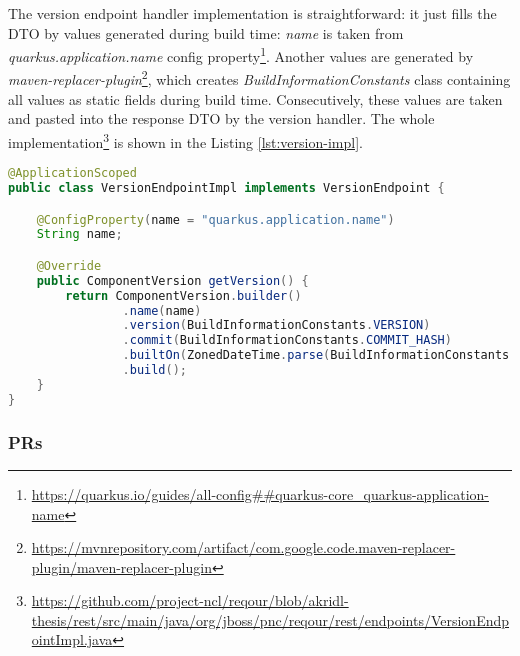 \documentclass[../main.tex]{subfiles}
\begin{document}
The version endpoint handler implementation is straightforward: it just fills the DTO by values generated during build time: \textit{name} is taken from \textit{quarkus.application.name} config property\footnote{\url{https://quarkus.io/guides/all-config##quarkus-core_quarkus-application-name}}. Another values are generated by \textit{maven-replacer-plugin}\footnote{\url{https://mvnrepository.com/artifact/com.google.code.maven-replacer-plugin/maven-replacer-plugin}}, which creates \textit{BuildInformationConstants} class containing all values as static fields during build time. Consecutively, these values are taken and pasted into the response DTO by the version handler. The whole implementation\footnote{\url{https://github.com/project-ncl/reqour/blob/akridl-thesis/rest/src/main/java/org/jboss/pnc/reqour/rest/endpoints/VersionEndpointImpl.java}} is shown in the Listing \ref{lst:version-impl}.

\begin{lstlisting}[language=Java, caption=Implementation of version endpoint, label={lst:version-impl}]
@ApplicationScoped
public class VersionEndpointImpl implements VersionEndpoint {

    @ConfigProperty(name = "quarkus.application.name")
    String name;

    @Override
    public ComponentVersion getVersion() {
        return ComponentVersion.builder()
                .name(name)
                .version(BuildInformationConstants.VERSION)
                .commit(BuildInformationConstants.COMMIT_HASH)
                .builtOn(ZonedDateTime.parse(BuildInformationConstants.BUILD_TIME))
                .build();
    }
}
\end{lstlisting}

\subsubsection*{PRs}

\end{document}
